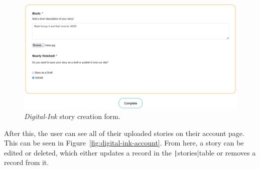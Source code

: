 \begin{figure}[!htbp]
    \centering
    \hfill
    \hfill
    \includegraphics[width=150mm]{resources/webapp/digital-ink-create-story-3}
    \caption{\textit{Digital-Ink} story creation form.}
    \label{fig:digital-ink-create-story}
\end{figure}

\clearpage
After this, the user can see all of their uploaded stories on their account page.
This can be seen in Figure~\ref{fig:digital-ink-account}.
From here, a story can be edited or deleted, which either updates a record in the \texttt|stories|table or
removes a record from it.

